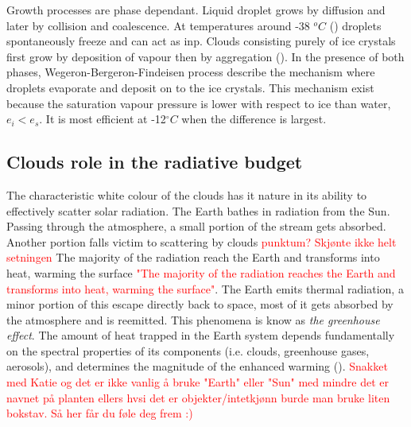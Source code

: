 Growth processes are phase dependant. Liquid droplet grows by diffusion and later by collision and coalescence. At temperatures around -38 $^oC$ (\cite{lohmann2016}) droplets spontaneously freeze and can act as \acrshort{inp}. Clouds consisting purely of ice crystals first grow by deposition of vapour then by aggregation (\cite{Fowler1996LiquidAssumptions}). In the presence of both phases, Wegeron-Bergeron-Findeisen process describe the mechanism where droplets evaporate and deposit on to the ice crystals. %
This mechanism exist because the saturation vapour pressure is lower with respect to ice than water, $e_i < e_s$. It is most efficient at -12$^{\circ}C$ when the difference is largest.


\subsection{Clouds role in the radiative budget}
The characteristic white colour of the clouds has it nature in its ability to  effectively scatter solar radiation. %
The Earth bathes in radiation from the Sun. Passing through the atmosphere, a small portion of the stream gets absorbed. Another portion falls victim to scattering by clouds \textcolor{red}{punktum? Skjønte ikke helt setningen}%
The majority of the radiation reach the Earth and transforms into heat, warming the surface \textcolor{red}{"The majority of the radiation reaches the Earth and transforms into heat, warming the surface"}. The Earth emits thermal radiation, a minor portion of this escape directly back to space, most of it gets absorbed by the atmosphere and is reemitted. This phenomena is know as \textit{the greenhouse effect}. The amount of heat trapped in the Earth system depends fundamentally on the spectral properties of its components (i.e. clouds, greenhouse gases, aerosols), and determines the magnitude of the enhanced warming (\cite{greenhouse_effect}).
\textcolor{red}{Snakket med Katie og det er ikke vanlig å bruke "Earth" eller "Sun" med mindre det er navnet på planten ellers hvsi det er objekter/intetkjønn burde man bruke liten bokstav. Så her får du føle deg frem :)}

